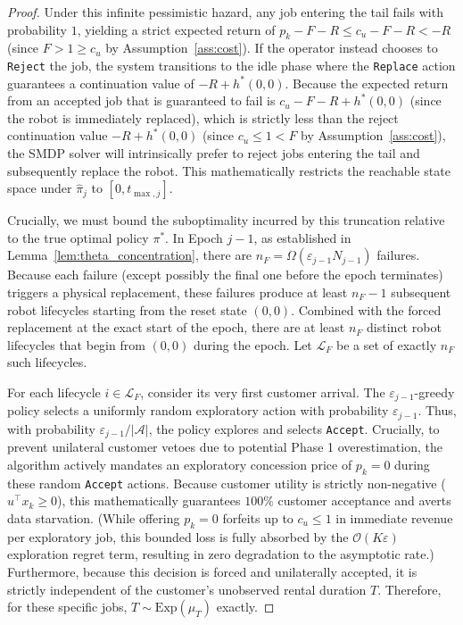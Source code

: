 \documentclass[letterpaper, 10 pt, conference]{IEEEconf}
\newcommand{\what}[1]{\widehat{#1}}
\begin{document}
\begin{proof}
    Under this infinite pessimistic hazard, any job entering the tail fails with probability $1$, yielding a strict expected return of $p_k - F - R \le c_u - F - R < -R$ (since $F > 1 \ge c_u$ by Assumption~\ref{ass:cost}). If the operator instead chooses to \texttt{Reject} the job, the system transitions to the idle phase where the \texttt{Replace} action guarantees a continuation value of $-R + h^*(0,0)$. Because the expected return from an accepted job that is guaranteed to fail is $c_u - F - R + h^*(0,0)$ (since the robot is immediately replaced), which is strictly less than the reject continuation value $-R + h^*(0,0)$ (since $c_u \le 1 < F$ by Assumption~\ref{ass:cost}), the SMDP solver will intrinsically prefer to reject jobs entering the tail and subsequently replace the robot. This mathematically restricts the reachable state space under $\what{\pi}_j$ to $[0, t_{\max,j}]$.

    Crucially, we must bound the suboptimality incurred by this truncation relative to the true optimal policy $\pi^*$. In Epoch $j-1$, as established in Lemma~\ref{lem:theta_concentration}, there are $n_F = \Omega(\varepsilon_{j-1} N_{j-1})$ failures. Because each failure (except possibly the final one before the epoch terminates) triggers a physical replacement, these failures produce at least $n_F - 1$ subsequent robot lifecycles starting from the reset state $(0,0)$. Combined with the forced replacement at the exact start of the epoch, there are at least $n_F$ distinct robot lifecycles that begin from $(0,0)$ during the epoch. Let $\mathcal{L}_F$ be a set of exactly $n_F$ such lifecycles.

    For each lifecycle $i \in \mathcal{L}_F$, consider its very first customer arrival. The $\varepsilon_{j-1}$-greedy policy selects a uniformly random exploratory action with probability $\varepsilon_{j-1}$. Thus, with probability $\varepsilon_{j-1}/|\mathcal{A}|$, the policy explores and selects \texttt{Accept}. Crucially, to prevent unilateral customer vetoes due to potential Phase 1 overestimation, the algorithm actively mandates an exploratory concession price of $p_k = 0$ during these random \texttt{Accept} actions. Because customer utility is strictly non-negative ($u^\top x_k \ge 0$), this mathematically guarantees $100\%$ customer acceptance and averts data starvation. (While offering $p_k = 0$ forfeits up to $c_u \le 1$ in immediate revenue per exploratory job, this bounded loss is fully absorbed by the $\mathcal{O}(K\varepsilon)$ exploration regret term, resulting in zero degradation to the asymptotic rate.) Furthermore, because this decision is forced and unilaterally accepted, it is strictly independent of the customer's unobserved rental duration $T$. Therefore, for these specific jobs, $T \sim \mathrm{Exp}(\mu_T)$ exactly.


\end{proof}
\end{document}
